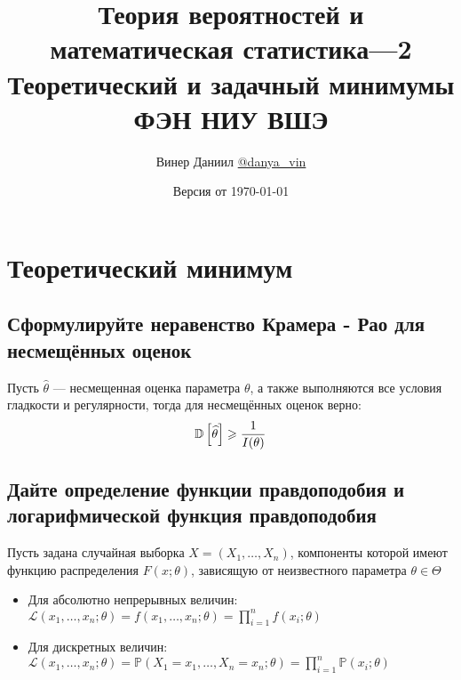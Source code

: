 \documentclass{article}
\title{\LARGE{Теория вероятностей и математическая статистика—2}\\
Теоретический и задачный минимумы\\
ФЭН НИУ ВШЭ}
\author{Винер Даниил  \href{https://t.me/danya_vin}{@danya\_vin}}
\date{Версия от \today}
\begin{document}
\maketitle
\tableofcontents
\newpage
\setlength{\parindent}{15pt}
\setlength{\parskip}{2mm}
\section{Теоретический минимум}

\subsection{Сформулируйте неравенство Крамера - Рао для несмещённых оценок}
Пусть $\widehat{\theta}$ — несмещенная оценка параметра $\theta$, а также выполняются все условия гладкости и регулярности, тогда для несмещённых оценок верно:
\begin{equation*}
    \mathbb{D}\left[\widehat{\theta}\right]\geqslant \frac{1}{I(\theta)}
\end{equation*}

\subsection{Дайте определение функции правдоподобия и логарифмической функция правдоподобия}
 Пусть задана случайная выборка $X=\left(X_{1}, \ldots, X_{n}\right)$, компоненты которой имеют функцию распределения $F(x; \theta)$, зависящую от неизвестного параметра $\theta \in \Theta$
\begin{itemize}
    \item Для абсолютно непрерывных величин: $\mathcal{L}\left(x_{1}, \ldots, x_{n} ; \theta\right)=f\left(x_{1}, \ldots, x_{n} ; \theta\right)=\displaystyle\prod_{i=1}^n f(x_i;\theta)$
    \item Для дискретных величин: $\mathcal{L}\left(x_{1}, \ldots, x_{n} ; \theta\right)=\mathbb{P}\left(X_1=x_1,\ldots,X_n=x_n;\theta\right)=\displaystyle\prod_{i=1}^n\mathbb{P}\left(x_i;\theta\right)$
\end{itemize}
\end{document}
